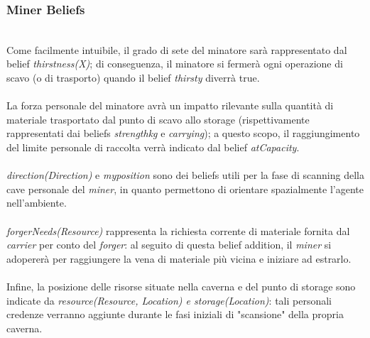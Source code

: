 \documentclass{llncs}
\begin{document}
\subsubsection{Miner Beliefs}~
\\
Come facilmente intuibile, il grado di sete del minatore sarà rappresentato dal belief \textit{thirstness(X)}; di conseguenza, il minatore si fermerà ogni operazione di scavo (o di trasporto) quando il belief \textit{thirsty} diverrà true.\\\\
La forza personale del minatore avrà un impatto rilevante sulla quantità di materiale trasportato dal punto di scavo allo storage (rispettivamente rappresentati dai beliefs \textit{strength\textunderscore kg} e \textit{carrying}); a questo scopo, il raggiungimento del limite personale di raccolta verrà indicato dal belief \textit{atCapacity}.\\\\
\textit{direction(Direction)} e \textit{my\textunderscore position} sono dei beliefs utili per la fase di scanning della cave personale del \textit{miner}, in quanto permettono di orientare spazialmente l'agente nell'ambiente.\\\\
\textit{forgerNeeds(Resource)} rappresenta la richiesta corrente di materiale fornita dal \textit{ carrier} per conto del \textit{forger}: al seguito di questa belief addition, il \textit{miner} si adopererà per raggiungere la vena di materiale più vicina e iniziare ad estrarlo.\\\\
Infine, la posizione delle risorse situate nella caverna e del punto di storage sono indicate da \textit{resource(Resource, Location) e storage(Location)}: tali personali credenze verranno aggiunte durante le fasi iniziali di "scansione" della propria caverna.
\end{document}
